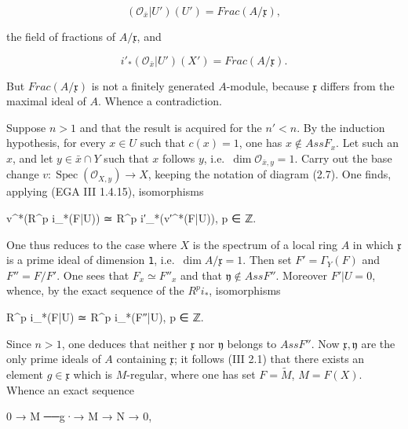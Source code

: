\documentclass[
  11pt,
  a4paper,
]{book}
\newenvironment{Shaded}{}{}
\newcommand{\NormalTok}[1]{#1}
\begin{document}
\[ (\mathcal{O}_{\bar{x}}|U')(U') = Frac(A/\mathfrak{x}), \]

the field of fractions of \(A/\mathfrak{x}\), and

\[ i'_{*}(\mathcal{O}_{\bar{x}}|U')(X') = Frac(A/\mathfrak{x}). \]

But \(Frac(A/\mathfrak{x})\) is not a finitely generated \(A\)-module,
because \(\mathfrak{x}\) differs from the maximal ideal of \(A\). Whence
a contradiction.

Suppose \(n > 1\) and that the result is acquired for the \(n' < n\). By
the induction hypothesis, for every \(x \in U\) such that \(c(x) = 1\),
one has \(x \notin Ass F_{x}\). Let such an \(x\), and let
\(y \in \bar{x} \cap Y\) such that \(x\) follows \(y\),
i.e.~\(\dim \mathcal{O}_{\bar{x}, y} = 1\). Carry out the base change
\(v : \operatorname{Spec}(\mathcal{O}_{X, y})
\to X\), keeping the notation of diagram (2.7). One finds, applying (EGA
III 1.4.15), isomorphisms

\begin{Shaded}
\begin{Highlighting}[]
\NormalTok{v\^{}*(R\^{}p i\_*(F|U)) ≃ R\^{}p i′\_*(v′\^{}*(F|U)),    p ∈ ℤ.}
\end{Highlighting}
\end{Shaded}

One thus reduces to the case where \(X\) is the spectrum of a local ring
\(A\) in which \(\mathfrak{x}\) is a prime ideal of dimension
\texttt{1}, i.e.~\(\dim A/\mathfrak{x} = 1\). Then set
\(F' = \Gamma_{Y}(F)\) and \(F'' = F/F'\). One sees that \(F_{x}
\simeq F''_{x}\) and that \(\mathfrak{y} \notin Ass F''\). Moreover
\(F'|U = 0\), whence, by the exact sequence of the \(R^{p}
i_{*}\), isomorphisms

\begin{Shaded}
\begin{Highlighting}[]
\NormalTok{R\^{}p i\_*(F|U) ≃ R\^{}p i\_*(F″|U),    p ∈ ℤ.}
\end{Highlighting}
\end{Shaded}

Since \(n > 1\), one deduces that neither \(\mathfrak{x}\) nor
\(\mathfrak{y}\) belongs to \(Ass F''\). Now \(\mathfrak{x},
\mathfrak{y}\) are the only prime ideals of \(A\) containing
\(\mathfrak{x}\); it follows (III 2.1) that there exists an element
\(g \in \mathfrak{x}\) which is \(M\)-regular, where one has set
\(F = \tilde{M}\), \(M = F(X)\). Whence an exact sequence

\begin{Shaded}
\begin{Highlighting}[]
\NormalTok{0 → M ──g·→ M → N → 0,}
\end{Highlighting}
\end{Shaded}
\end{document}
